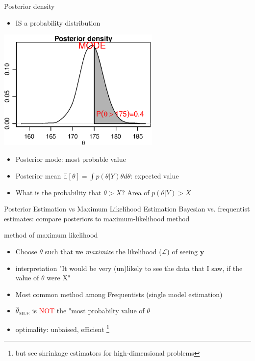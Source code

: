 \documentclass[presentation,9pt,xcolor=dvipsnames]{beamer}
\begin{document}
\begin{frame}[label={sec:orga0441df}]{Posterior density}
\begin{itemize}
\item IS a probability distribution
\end{itemize}
\begin{center}
\includegraphics[width=0.6\textwidth,height=0.6\textheight]{posterior4.eps}
\end{center}
\begin{itemize}
\item Posterior mode: most probable value
\item Posterior mean \(\mathbb{E}[\theta]=\int p(\theta\vert Y)\theta d\theta\): expected value
\item What is the probability that \(\theta>X\)? Area of \(p(\theta\vert Y)>X\)
\end{itemize}
\end{frame}
\begin{frame}[label={sec:org9f6225b}]{Posterior Estimation vs Maximum Likelihood Estimation}
Bayesian vs. frequentist estimates: compare posteriors to maximum-likelihood method
\begin{block}{method of maximum likelihood}
\begin{itemize}
\item Choose \(\theta\) such that we \emph{maximize} the likelihood (\(\mathcal{L}\)) of seeing \(\mathbf{y}\)
\item \alert{interpretation} "It would be very (un)likely to see the data that I saw, if the value of \(\theta\) were X"
\item Most common method among Frequentists (single model estimation)
\item \(\hat{\theta}_\text{MLE}\) is \textcolor{red}{NOT} the "most probabilty value of \(\theta\)
\item \alert{optimality}: unbaised, efficient \footnote{but see shrinkage estimators for high-dimensional problems}
\end{itemize}
\end{block}
\end{frame}
\end{document}
